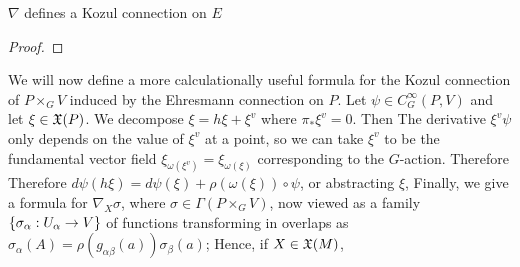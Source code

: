 \documentclass{article}
\begin{document}
\begin{prop}
	$\nabla$ defines a Kozul connection on $E$ 
\end{prop}
\begin{proof}
\end{proof}

We will now define a more calculationally useful formula for the Kozul connection of $P \times_G V$ induced by the Ehresmann connection on $P$. Let $\psi \in C^\infty_G(P,V)$ and let $\xi \in \mathfrak{X}(P)$. We decompose $\xi = h\xi + \xi^v$ where $\pi_\ast \xi^v = 0$. Then 
The derivative $\xi^v \psi$ only depends on the value of $\xi^v$ at a point, so we can take $\xi^v$ to be the fundamental vector field $\xi_{\omega(\xi^v)} = \xi_{\omega(\xi)}$ corresponding to the $G$-action. Therefore 
Therefore $d\psi(h\xi) = d\psi(\xi) + \rho(\omega(\xi)) \circ \psi$, or abstracting $\xi$, 
Finally, we give a formula for $\nabla_X \sigma$, where $\sigma \in \Gamma(P \times_G V)$, now viewed as a family $\left\{ \sigma_\alpha : U_\alpha \to V \right\}$ of functions transforming in overlaps as $\sigma_\alpha(A) = \rho(g_{\alpha\beta}(a)) \sigma_\beta(a)$;
Hence, if $X \in \mathfrak{X}(M)$, 
\end{document}
